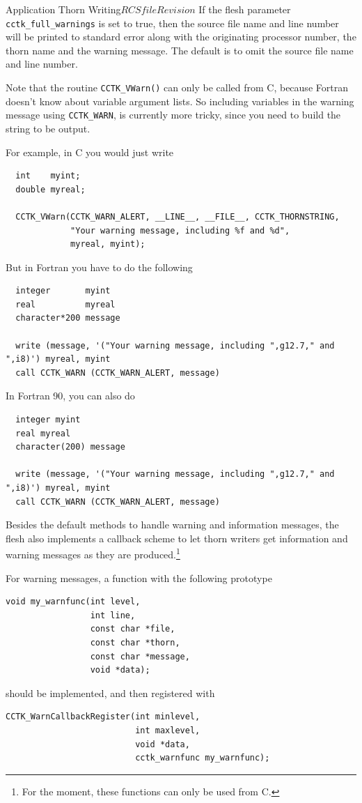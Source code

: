 \begin{cactuspart}{Application Thorn Writing}{$RCSfile$}{$Revision$}
If the flesh parameter \texttt{cctk\_full\_warnings} is set to true, then the
source file name and line number will be printed to standard error along with
the originating processor number, the thorn name and the warning message.
The default is to omit the source file name and line number.

Note that the routine \texttt{CCTK\_VWarn()} can only be called from C, because
Fortran doesn't know about variable argument lists. So including variables in
the warning message using \texttt{CCTK\_WARN}, is currently more tricky, since
you need to build the string to be output.

For example, in C you would just write
\begin{verbatim}
  int    myint;
  double myreal;

  CCTK_VWarn(CCTK_WARN_ALERT, __LINE__, __FILE__, CCTK_THORNSTRING,
             "Your warning message, including %f and %d",
             myreal, myint);
\end{verbatim}

But in Fortran you have to do the following
\begin{verbatim}
  integer       myint
  real          myreal
  character*200 message

  write (message, '("Your warning message, including ",g12.7," and ",i8)') myreal, myint
  call CCTK_WARN (CCTK_WARN_ALERT, message)
\end{verbatim}

In Fortran 90, you can also do
\begin{verbatim}
  integer myint
  real myreal
  character(200) message

  write (message, '("Your warning message, including ",g12.7," and ",i8)') myreal, myint
  call CCTK_WARN (CCTK_WARN_ALERT, message)
\end{verbatim}

Besides the default methods to handle warning and information
messages, the flesh also implements a callback scheme to let thorn
writers get information and warning messages as they are produced.\footnote{For the moment, these
functions can only be used from C.}

For warning messages, a function with the following prototype
\begin{verbatim}
void my_warnfunc(int level,
                 int line,
                 const char *file,
                 const char *thorn,
                 const char *message,
                 void *data);
\end{verbatim}
should be implemented, and then registered with 
\begin{verbatim}
CCTK_WarnCallbackRegister(int minlevel,
                          int maxlevel,
                          void *data,
                          cctk_warnfunc my_warnfunc);
\end{verbatim}


\end{cactuspart}
